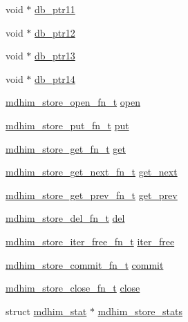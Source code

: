 \begin{DoxyCompactItemize}
void $\ast$ \hyperlink{structmdhim__store__t_acd81da642998a348ac407f50524d4032}{db\-\_\-ptr11}
\item 
void $\ast$ \hyperlink{structmdhim__store__t_a9c6398ca2b628620f016978c0da65a67}{db\-\_\-ptr12}
\item 
void $\ast$ \hyperlink{structmdhim__store__t_a74eff2c8440d426ba60ffcf037a11b4a}{db\-\_\-ptr13}
\item 
void $\ast$ \hyperlink{structmdhim__store__t_aac29ef96c83258441f7e697e2e87abdc}{db\-\_\-ptr14}
\item 
\hyperlink{data__store_8h_a44d8a5b415c89e7fed71af96ace09e27}{mdhim\-\_\-store\-\_\-open\-\_\-fn\-\_\-t} \hyperlink{structmdhim__store__t_a8d77b86eb31d677f36b46f653865ea1d}{open}
\item 
\hyperlink{data__store_8h_a53be65de68e4f03efc8816cdd2ce65b8}{mdhim\-\_\-store\-\_\-put\-\_\-fn\-\_\-t} \hyperlink{structmdhim__store__t_a5a33c9ea5897fdf71a54573ea49fef18}{put}
\item 
\hyperlink{data__store_8h_a39ec0bff4eb89b9081fdaaa94700766f}{mdhim\-\_\-store\-\_\-get\-\_\-fn\-\_\-t} \hyperlink{structmdhim__store__t_a6ad0450519e040a4ae11631aa6202b24}{get}
\item 
\hyperlink{data__store_8h_a012fd08fcc7f06da0e4a57656038c394}{mdhim\-\_\-store\-\_\-get\-\_\-next\-\_\-fn\-\_\-t} \hyperlink{structmdhim__store__t_a0e42f0e911de2adb2616228f3ffbfd99}{get\-\_\-next}
\item 
\hyperlink{data__store_8h_a59ef8747e7f140c68bd8fff69a583eea}{mdhim\-\_\-store\-\_\-get\-\_\-prev\-\_\-fn\-\_\-t} \hyperlink{structmdhim__store__t_a43c5445119b911e3da419f26c5aae232}{get\-\_\-prev}
\item 
\hyperlink{data__store_8h_aabc5c9879c73c85349c660530f687f52}{mdhim\-\_\-store\-\_\-del\-\_\-fn\-\_\-t} \hyperlink{structmdhim__store__t_a3cf5374069e55121b50e4567a1e5e2e1}{del}
\item 
\hyperlink{data__store_8h_ae1d0aa9a10749f38825b64354388c302}{mdhim\-\_\-store\-\_\-iter\-\_\-free\-\_\-fn\-\_\-t} \hyperlink{structmdhim__store__t_ab572d429dc38a940f922866bc328e809}{iter\-\_\-free}
\item 
\hyperlink{data__store_8h_acbf72a3c5eaa36c296d1ecf18ab6e1ed}{mdhim\-\_\-store\-\_\-commit\-\_\-fn\-\_\-t} \hyperlink{structmdhim__store__t_ae67ea767684de68875b9bfda9cdb8c08}{commit}
\item 
\hyperlink{data__store_8h_a07e2ae82dfe71d97db0129a9e8d29eeb}{mdhim\-\_\-store\-\_\-close\-\_\-fn\-\_\-t} \hyperlink{structmdhim__store__t_a41daefe3effd7441930c4296fb6002de}{close}
\item 
struct \hyperlink{structmdhim__stat}{mdhim\-\_\-stat} $\ast$ \hyperlink{structmdhim__store__t_a1492cc46cbe9e18147fd957db92afa47}{mdhim\-\_\-store\-\_\-stats}
\end{DoxyCompactItemize}


